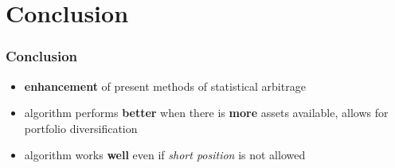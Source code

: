 \documentclass[11pt]{beamer}
\begin{document}
  \section{Conclusion}
  {
  \begin{frame}
    \frametitle{Conclusion}
    \begin{itemize}
      \item \textbf{enhancement} of present methods of statistical arbitrage
      \item algorithm performs \textbf{better} when there is \textbf{more} assets available, allows for portfolio diversification
      \item algorithm works \textbf{well} even if \emph{short position} is not allowed
    \end{itemize}
    
  \end{frame}
  }
\end{document}
